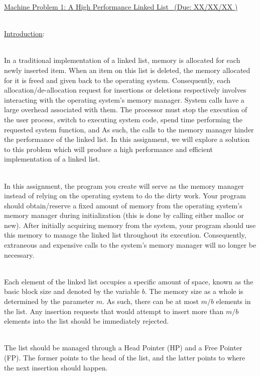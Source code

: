 \documentclass[12pt]{extarticle}
\newenvironment{myindentpar}[1]%
 {\begin{list}{}%
         {\setlength{\leftmargin}{#1}}%
         \item[]%
 }
 {\end{list}}
\newcommand{\duedate}{XX/XX/XX }
\begin{document}
\begin{center}
    \underline{{\large Machine Problem 1: A High Performance Linked List \  }(Due: \duedate)}  \\
\end{center}


\ \\
{\large \underline{Introduction}:}

\begin{myindentpar}{6.5mm}

\ \\
In a traditional implementation of a linked list, memory is allocated for each newly inserted item.  When an item on this list is deleted, the memory allocated for it is freed and given back to the operating system.  Consequently, each allocation/de-allocation request for insertions or deletions respectively involves interacting with the operating system's memory manager.  System calls have a large overhead associated with them.  The processor must stop the execution of the user process, switch to executing system code, spend time performing the requested system function, and   As such, the calls to the memory manager hinder the performance of the linked list.  In this assignment, we will explore a solution to this problem which will produce a high performance and efficient implementation of a linked list.  

\ \\
In this assignment, the program you create will serve as the memory manager instead of relying on the operating system to do the dirty work.  Your program should obtain/reserve a fixed amount of memory from the operating system's memory manager during initialization (this is done by calling either malloc or new).  After initially acquiring memory from the system, your program should use this memory to manage the linked list throughout its execution.  Consequently, extraneous and expensive calls to the system's memory manager will no longer be necessary.  

\ \\
Each element of the linked list occupies a specific amount of space, known as the basic block size and denoted by the variable $b$.  The memory size as a whole is determined by the parameter $m$.  As such, there can be at most $m / b$ elements in the list.  Any insertion requests that would attempt to insert more than $m / b$ elements into the list should be immediately rejected.  

\ \\
The list should be managed through a Head Pointer (HP) and a Free Pointer (FP).  The former points to the head of the list, and the latter points to where the next insertion should happen.  


\end{myindentpar}
\end{document}
